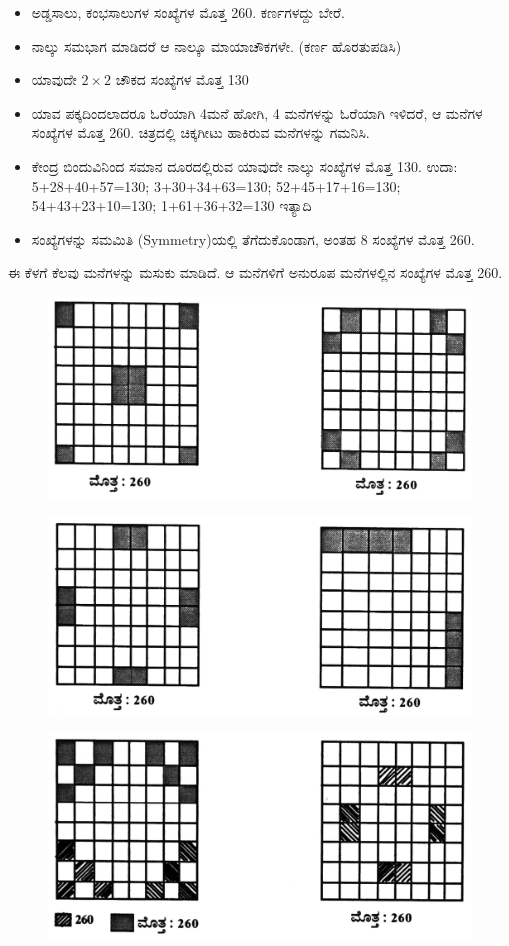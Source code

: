 \begin{itemize}
	\item ಅಡ್ಡಸಾಲು, ಕಂಭಸಾಲುಗಳ ಸಂಖ್ಯೆಗಳ ಮೊತ್ತ 260. ಕರ್ಣಗಳದ್ದು ಬೇರೆ.
	\item ನಾಲ್ಕು ಸಮಭಾಗ ಮಾಡಿದರೆ ಆ ನಾಲ್ಕೂ ಮಾಯಾಚೌಕಗಳೇ. (ಕರ್ಣ ಹೊರತುಪಡಿಸಿ)
	\item ಯಾವುದೇ $2 \times 2$ ಚೌಕದ ಸಂಖ್ಯೆಗಳ ಮೊತ್ತ 130
	\item ಯಾವ ಪಕ್ಕದಿಂದಲಾದರೂ ಓರೆಯಾಗಿ 4ಮನೆ ಹೋಗಿ, 4 ಮನೆಗಳನ್ನು ಓರೆಯಾಗಿ ಇಳಿದರೆ, ಆ ಮನೆಗಳ ಸಂಖ್ಯೆಗಳ ಮೊತ್ತ 260. ಚಿತ್ರದಲ್ಲಿ ಚಿಕ್ಕಗೀಟು ಹಾಕಿರುವ ಮನೆಗಳನ್ನು ಗಮನಿಸಿ.
	\item ಕೇಂದ್ರ ಬಿಂದುವಿನಿಂದ ಸಮಾನ ದೂರದಲ್ಲಿರುವ ಯಾವುದೇ ನಾಲ್ಕು ಸಂಖ್ಯೆಗಳ ಮೊತ್ತ 130. ಉದಾ: 5+28+40+57=130; 3+30+34+63=130; 52+45+17+16=130; 54+43+23+10=130; 1+61+36+32=130 ಇತ್ಯಾದಿ
	\item ಸಂಖ್ಯೆಗಳನ್ನು ಸಮಮಿತಿ (Symmetry)ಯಲ್ಲಿ ತೆಗೆದುಕೊಂಡಾಗ, ಅಂತಹ 8 ಸಂಖ್ಯೆಗಳ ಮೊತ್ತ 260.
\end{itemize}
ಈ ಕೆಳಗೆ ಕೆಲವು ಮನೆಗಳನ್ನು ಮಸುಕು ಮಾಡಿದೆ. ಆ ಮನೆಗಳಿಗೆ ಅನುರೂಪ ಮನೆಗಳಲ್ಲಿನ ಸಂಖ್ಯೆಗಳ ಮೊತ್ತ 260.
\begin{figure}[H]
\includegraphics{src/figures/chap7/fig7.3.jpg}
\end{figure}
\begin{figure}[H]
\includegraphics{src/figures/chap7/fig7.4.jpg}
\end{figure}
\begin{figure}[H]
\includegraphics{src/figures/chap7/fig7.5.jpg}
\end{figure}
